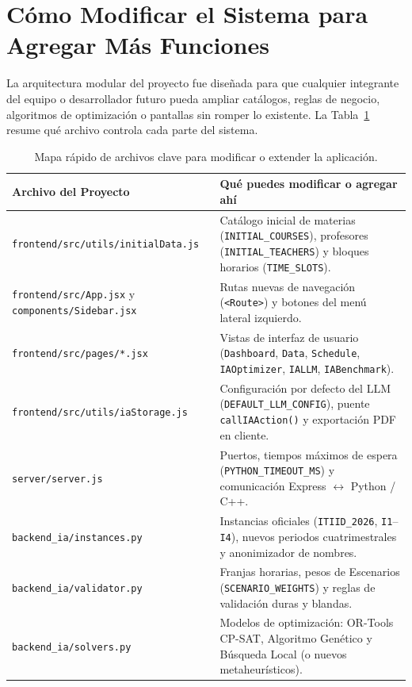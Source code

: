 \documentclass[11pt,letterpaper]{article}
\newcommand{\seccionUPV}[1]{%
    \section{\texorpdfstring{\textcolor{upvmorado}{#1}}{#1}}%
    \vspace{-0.22cm}{\color{upvnaranja}\rule{\textwidth}{1.1pt}}\vspace{0.12cm}%
}
\begin{document}
\newpage
\seccionUPV{Cómo Modificar el Sistema para Agregar Más Funciones}

La arquitectura modular del proyecto fue diseñada para que cualquier integrante del equipo o desarrollador futuro pueda ampliar catálogos, reglas de negocio, algoritmos de optimización o pantallas sin romper lo existente. La Tabla~\ref{tab:archivos} resume qué archivo controla cada parte del sistema.

\begin{table}[htbp]
\centering
\small
\caption{Mapa rápido de archivos clave para modificar o extender la aplicación.}
\label{tab:archivos}
\begin{tabularx}{\textwidth}{@{}>{\raggedright\arraybackslash}p{6.2cm}>{\raggedright\arraybackslash}X@{}}
\toprule
\textbf{Archivo del Proyecto} & \textbf{Qué puedes modificar o agregar ahí} \\
\midrule
\texttt{frontend/src/utils/initialData.js} & Catálogo inicial de materias (\texttt{INITIAL\_COURSES}), profesores (\texttt{INITIAL\_TEACHERS}) y bloques horarios (\texttt{TIME\_SLOTS}). \\
\texttt{frontend/src/App.jsx} y \texttt{components/Sidebar.jsx} & Rutas nuevas de navegación (\texttt{<Route>}) y botones del menú lateral izquierdo. \\
\texttt{frontend/src/pages/*.jsx} & Vistas de interfaz de usuario (\texttt{Dashboard}, \texttt{Data}, \texttt{Schedule}, \texttt{IAOptimizer}, \texttt{IALLM}, \texttt{IABenchmark}). \\
\texttt{frontend/src/utils/iaStorage.js} & Configuración por defecto del LLM (\texttt{DEFAULT\_LLM\_CONFIG}), puente \texttt{callIAAction()} y exportación PDF en cliente. \\
\texttt{server/server.js} & Puertos, tiempos máximos de espera (\texttt{PYTHON\_TIMEOUT\_MS}) y comunicación Express $\leftrightarrow$ Python / C++. \\
\texttt{backend\_ia/instances.py} & Instancias oficiales (\texttt{ITIID\_2026}, \texttt{I1}--\texttt{I4}), nuevos periodos cuatrimestrales y anonimizador de nombres. \\
\texttt{backend\_ia/validator.py} & Franjas horarias, pesos de Escenarios (\texttt{SCENARIO\_WEIGHTS}) y reglas de validación duras y blandas. \\
\texttt{backend\_ia/solvers.py} & Modelos de optimización: OR-Tools CP-SAT, Algoritmo Genético y Búsqueda Local (o nuevos metaheurísticos). \\

\end{tabularx}
\end{table}
\end{document}
